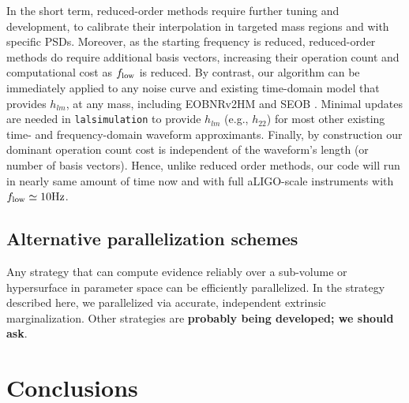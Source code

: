 \documentclass[twocolumn,prd,nofootinbib]{revtex4}
\newcommand\unit[1]{{\rm #1}}
\begin{document}
In the short term, reduced-order methods require further tuning and development, to calibrate their interpolation in
targeted mass regions and with specific PSDs.
Moreover, as the starting frequency is reduced, reduced-order methods do require additional basis vectors, increasing
their operation count and computational cost as $f_{\rm low}$ is reduced.
%
  By contrast,
our algorithm can be immediately applied to any noise curve and existing time-domain model that provides $h_{lm}$,  at any mass,
including EOBNRv2HM \cite{gw-astro-EOBNR-Calibrated-2009} and SEOB \cite{gw-astro-EOBspin-Tarrachini2012}.  Minimal
updates are  needed in \texttt{lalsimulation} to provide $h_{lm}$ (e.g., $h_{22}$) for most
other existing time- and frequency-domain waveform approximants.  
%
%
Finally, by construction our dominant operation count cost is  independent of the waveform's length (or number of basis
vectors).  Hence, unlike reduced order methods, our code will run in nearly same amount of time now and with full
aLIGO-scale instruments with $f_{\rm low}\simeq 10\unit{Hz}$.  


\subsection{Alternative parallelization schemes}
Any strategy that can compute evidence reliably over a sub-volume or hypersurface in parameter space
can be efficiently parallelized.   In the strategy described here, we parallelized via accurate, independent extrinsic marginalization.  
%
Other strategies are \textbf{probably being developed; we should ask}.




\section{Conclusions}
\end{document}
